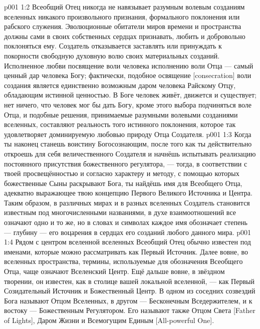 \vs p001 1:2 Всеобщий Отец никогда не навязывает разумным волевым созданиям вселенных никакого произвольного признания, формального поклонения или рабского служения. Эволюционные обитатели миров времени и пространства должны сами в своих собственных сердцах признавать, любить и добровольно поклоняться ему. Создатель отказывается заставлять или принуждать к покорности свободную духовную волю своих материальных созданий. Исполненное любви посвящение воли человека исполнению воли Отца --- самый ценный дар человека Богу; фактически, подобное освящение [consecration] воли создания является единственно возможным даром человека Райскому Отцу, обладающим истинной ценностью. В Боге человек живёт, движется и существует; нет ничего, что человек мог бы дать Богу, кроме этого выбора подчиняться воле Отца, и подобные решения, принимаемые разумными волевыми созданиями вселенных, составляют реальность того истинного поклонения, которое так удовлетворяет доминируемую любовью природу Отца Создателя.
\vs p001 1:3 Когда ты наконец станешь воистину Богосознающим, после того как ты действительно откроешь для себя величественного Создателя и начнёшь испытывать реализацию постоянного присутствия божественного регулятора, --- тогда, в соответствии с твоей просвещённостью и согласно характеру и методу, с помощью которых божественные Сыны раскрывают Бога, ты найдёшь имя для Всеобщего Отца, адекватно выражающее твою концепцию Первого Великого Источника и Центра. Таким образом, в различных мирах и в разных вселенных Создатель становится известным под многочисленными названиями, в духе взаимоотношений все означают одно и то же, но в словах и символах каждое имя обозначает степень --- глубину --- его воцарения в сердцах его созданий любого данного мира.
\vs p001 1:4 \pc Рядом с центром вселенной вселенных Всеобщий Отец обычно известен под именами, которые можно рассматривать как Первый Источник. Далее вовне, во вселенных пространства, термины, используемые для обозначения Всеобщего Отца, чаще означают Вселенский Центр. Ещё дальше вовне, в звёздном творении, он известен, как в столице вашей локальной вселенной, --- как Первый Созидательный Источник и Божественный Центр. В одном из соседних созвездий Бога называют Отцом Вселенных, в другом --- Бесконечным Вседержителем, и к востоку --- Божественным Регулятором. Его называют также Отцом Света [Father of Lights], Даром Жизни и Всемогущим Единым [All\hyp{}powerful One].
